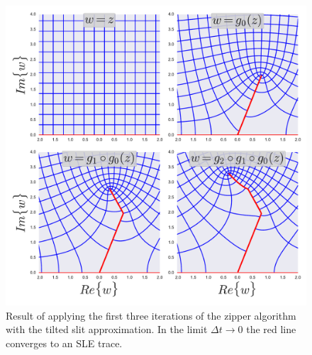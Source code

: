 \begin{figure}
\begin{center}
    \includegraphics[scale=0.5]{chapters/ch4-sle/figs/zipper}
\end{center}
\caption{Result of applying the first three iterations of the zipper algorithm
    with the tilted slit approximation. In the limit $\Delta t\rightarrow 0$
    the red line converges to an SLE trace.}
\label{fig:zipper}
\end{figure}
